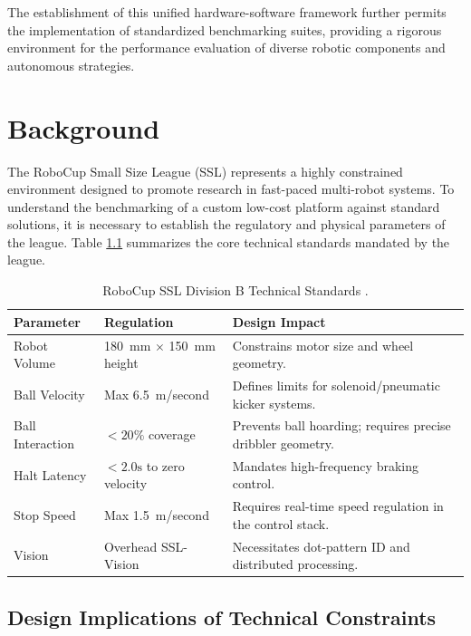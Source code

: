 \documentclass[a4paper,twoside,12pt]{report}
\begin{document}
The establishment of this unified hardware-software framework further permits the implementation of standardized benchmarking suites, providing a rigorous environment for the performance evaluation of diverse robotic components and autonomous strategies. 

\chapter{Background}\label{chapter: background}

The RoboCup Small Size League (SSL) represents a highly constrained environment designed to promote research in fast-paced multi-robot systems. 
To understand the benchmarking of a custom low-cost platform against standard solutions, it is necessary to establish the regulatory and physical parameters of the league. 
Table \ref{tab:ssl_rules} summarizes the core technical standards mandated by the league.

\begin{table}[H]
    \centering
    \caption{RoboCup SSL Division B Technical Standards \cite{ssl_rules_2026}.}
    \label{tab:ssl_rules}
    \begin{tabularx}{\textwidth}{l l X}
        \toprule
        \textbf{Parameter} & \textbf{Regulation} & \textbf{Design Impact} \\
        \midrule
        Robot Volume & \SI{180}{\mm} $\times$ \SI{150}{\mm} height & Constrains motor size and wheel geometry. \\
        Ball Velocity & Max \SI{6.5}{\meter/second} & Defines limits for solenoid/pneumatic kicker systems. \\
        Ball Interaction & $< 20\%$ coverage & Prevents ball hoarding; requires precise dribbler geometry. \\
        Halt Latency & $< 2.0\text{s}$ to zero velocity & Mandates high-frequency braking control. \\
        Stop Speed & Max \SI{1.5}{\meter/second} & Requires real-time speed regulation in the control stack. \\
        Vision & Overhead SSL-Vision & Necessitates dot-pattern ID and distributed processing. \\
        \bottomrule
    \end{tabularx}
\end{table}

\section{Design Implications of Technical Constraints}
\end{document}
